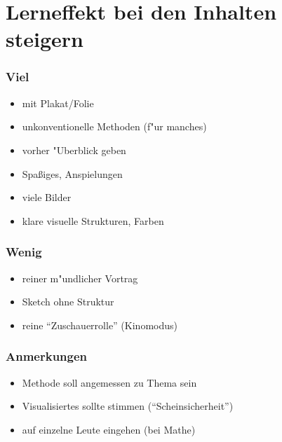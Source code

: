 \section{Lerneffekt bei den Inhalten steigern}

\subsubsection{Viel}
\begin{itemize}
\item mit Plakat/Folie
\item unkonventionelle Methoden (f"ur manches)
\item vorher "Uberblick geben
\item Spaßiges, Anspielungen
\item viele Bilder
\item klare visuelle Strukturen, Farben
\end{itemize}

\subsubsection{Wenig}
\begin{itemize}
\item reiner m"undlicher Vortrag
\item Sketch ohne Struktur
\item reine "`Zuschauerrolle"' (Kinomodus)
\end{itemize}

\subsubsection{Anmerkungen}
\begin{itemize}
\item Methode soll angemessen zu Thema sein
\item Visualisiertes sollte stimmen ("`Scheinsicherheit"')
\item auf einzelne Leute eingehen (bei Mathe)
\end{itemize}
